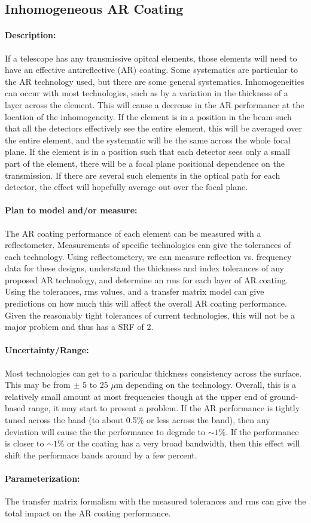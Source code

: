 \subsection{Inhomogeneous AR Coating}

\paragraph{Description:}
If a telescope has any transmissive opitcal elements, those elements will need to have an effective antireflective (AR) coating.  Some systematics are particular to the AR technology used, but there are some general systematics.  Inhomogeneities can occur with most technologies, such as by a variation in the thickness of a layer across the element.  This will cause a decrease in the AR performance at the location of the inhomogeneity.  If the element is in a position in the beam such that all the detectors effectively see the entire element, this will be averaged over the entire element, and the systematic will be the same across the whole focal plane.  If the element is in a position such that each detector sees only a small part of the element, there will be a focal plane positional dependence on the transmission.  If there are several such elements in the optical path for each detector, the effect will hopefully average out over the focal plane.

\paragraph{Plan to model and/or measure:}
The AR coating performance of each element can be measured with a reflectometer. Measurements of specific technologies can give the tolerances of each technology. Using reflectometery, we can measure reflection vs. frequency data for these designs, understand the thickness and index tolerances of any proposed AR technology, and determine an rms for each layer of AR coating. Using the tolerances, rms values, and a transfer matrix model can give predictions on how much this will affect the overall AR coating performance. Given the reasonably tight tolerances of current technologies, this will not be a major problem and thus has a SRF of 2.

\paragraph{Uncertainty/Range:}
Most technologies can get to a paricular thickness consistency across the surface. This may be from $\pm$ 5 to 25 $\mu$m depending on the technology. Overall, this is a relatively small amount at most frequencies though at the upper end of ground-based range, it may start to present a problem. If the AR performance is tightly tuned across the band (to about 0.5\% or less across the band), then any deviation will cause the the performance to degrade to $\sim 1$\%. If the performance is closer to $\sim 1$\% or the coating has a very broad bandwidth, then this effect will shift the performace bands around by a few percent.  

\paragraph{Parameterization:}
The transfer matrix formalism with the measured tolerances and rms can give the total impact on the AR coating performance.
